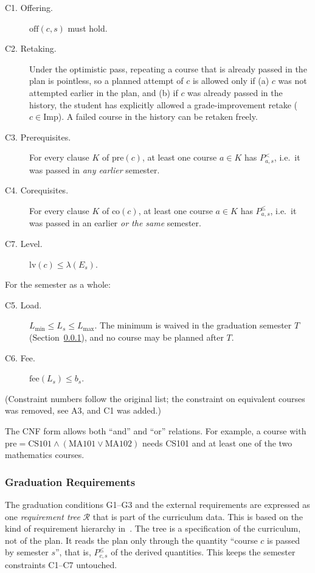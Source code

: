 \documentclass[10pt,a4paper]{article}
\begin{document}
\begin{description}
  \item[C1. Offering.] $\mathrm{off}(c,s)$ must hold.
  \item[C2. Retaking.] Under the optimistic pass, repeating a course that
        is already passed in the plan is pointless, so a planned attempt of
        $c$ is allowed only if
        (a) $c$ was not attempted earlier in the plan, and
        (b) if $c$ was already passed in the history, the student has
        explicitly allowed a grade-improvement retake ($c\in\mathrm{Imp}$).
        A failed course in the history can be retaken freely.
  \item[C3. Prerequisites.] For every clause $K$ of $\mathrm{pre}(c)$, at least
        one course $a\in K$ has $P^{<}_{a,s}$, i.e.\ it was passed in
        \emph{any earlier} semester.
  \item[C4. Corequisites.] For every clause $K$ of $\mathrm{co}(c)$, at least
        one course $a\in K$ has $P^{\le}_{a,s}$, i.e.\ it was passed in an
        earlier \emph{or the same} semester.
  \item[C7. Level.] $\mathrm{lv}(c) \le \lambda(E_s)$.
\end{description}
For the semester as a whole:
\begin{description}
  \item[C5. Load.] $L_{\min}\le L_s\le L_{\max}$. The minimum is waived in
        the graduation semester $T$ (Section~\ref{sec:graduation}), and no
        course may be planned after $T$.
  \item[C6. Fee.] $\mathrm{fee}(L_s)\le b_s$.
\end{description}
(Constraint numbers follow the original list; the constraint on equivalent
courses was removed, see A3, and C1 was added.)

The CNF form allows both ``and'' and ``or'' relations. For example, a course
with $\mathrm{pre}=\text{CS101}\wedge(\text{MA101}\vee\text{MA102})$ needs
CS101 and at least one of the two mathematics courses.

 
      \subsubsection{Graduation Requirements}
\label{sec:graduation}
 
The graduation conditions G1--G3 and the external requirements are expressed
as one \emph{requirement tree} $\mathcal{R}$ that is part of the curriculum data. This is based on the kind of requirement hierarchy in~\cite{skaggs2025constraint}. The tree is a specification of the curriculum, not of the plan. It
reads the plan only through the quantity ``course $c$ is passed by
semester $s$'', that is, $P^{\le}_{c,s}$ of the derived quantities. This
keeps the semester constraints C1--C7 untouched.
 
\end{document}

